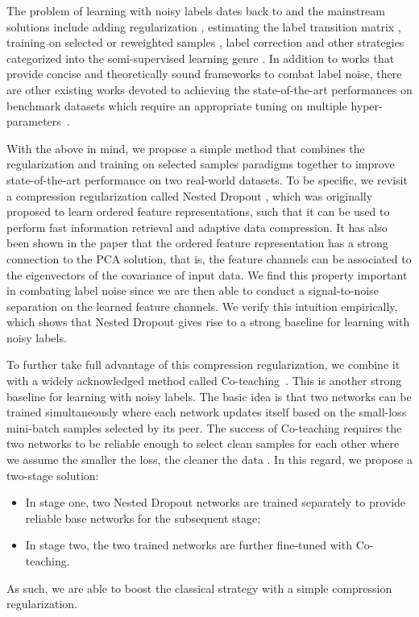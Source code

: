 \documentclass[final]{cvpr}
\begin{document}
The problem of learning with noisy labels dates back to \cite{angluin1988learning, quinlan1986induction} and the mainstream solutions include adding regularization \cite{ma2018dimensionality, natarajan2013learning}, estimating the label transition matrix \cite{patrini2017making}, training on selected or reweighted samples \cite{han2018co, jiang2018mentornet, malach2017decoupling, wei2020combating, yu2019does}, label correction \cite{PENCIL_CVPR_2019, zhang2021learning}
and other strategies categorized into the semi-supervised learning genre \cite{ding2018semi, kong2019recycling, li2020dividemix}. 
In addition to works that provide concise and theoretically sound frameworks to combat label noise, there are other existing works devoted to achieving the state-of-the-art performances on benchmark datasets which require an appropriate tuning on multiple hyper-parameters~\cite{li2020dividemix, zhang2021learning}.


With the above in mind, we propose a simple method that combines the regularization and training on selected samples paradigms together to improve state-of-the-art performance on two real-world datasets. 
To be specific, we revisit a compression regularization called Nested Dropout \cite{rippel2014learning},
which was originally proposed to learn ordered feature representations, 
such that it can be used to perform fast information retrieval and adaptive data compression.  
It has also been shown in the paper that the ordered feature representation has a strong connection to the PCA solution, that is, the feature channels can be associated to the eigenvectors of the covariance of input data. 
We find this property 
important in combating label noise since we are then able to conduct a signal-to-noise separation on the learned feature channels. 
We verify this intuition empirically, which shows that Nested Dropout gives rise to a strong baseline for learning with noisy labels. 

To further take full advantage of this compression regularization, we combine it with a widely acknowledged method called Co-teaching~\cite{han2018co}.
This is another strong baseline for learning with noisy labels. The basic idea is that two networks can be trained simultaneously where each network updates itself based on the small-loss mini-batch samples selected by its peer. 
The success of Co-teaching requires the two networks to be reliable enough to select clean samples for each other where we assume the smaller the loss, the cleaner the data \cite{han2018co, jiang2018mentornet, kumar2010self, tanaka2018joint, yu2019does}.
In this regard, we propose a two-stage solution: 
\begin{itemize}
\item In stage one, two Nested Dropout networks are trained separately to provide reliable base networks for the subsequent stage; 
\item In stage two, the two trained networks are further fine-tuned with Co-teaching.
\end{itemize}
As such, we are able to boost the classical strategy with a simple compression regularization.
\end{document}
